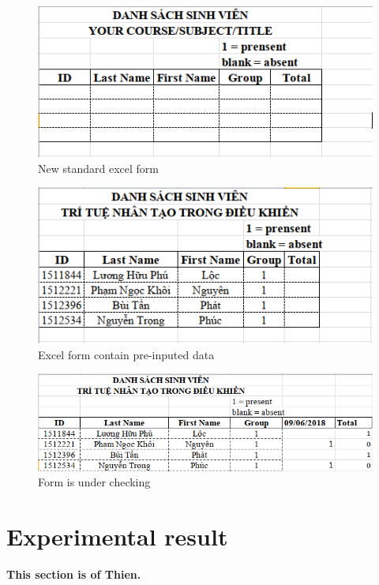 \documentclass[journal, twocolumn]{IEEEtran}
\begin{document}
\begin{figure}
    \centering
    \includegraphics[width=0.8\linewidth]{img/form-new.png}
	\caption{New standard excel form}\label{fig:form-new}
\end{figure}

\begin{figure}
    \centering
    \includegraphics[width=0.8\linewidth]{img/form-data.png}
	\caption{Excel form contain pre-inputed data}\label{fig:form-data}
\end{figure}

\begin{figure}
    \centering
    \includegraphics[width=0.8\linewidth]{img/form-checked.png}
	\caption{Form is under checking}\label{fig:form-checked}
\end{figure}


\medskip
\section{Experimental result}
\label{experimental-result}
\textbf{This section is of Thien.}


\begin{thebibliography}{9}

\end{thebibliography}
\end{document}
